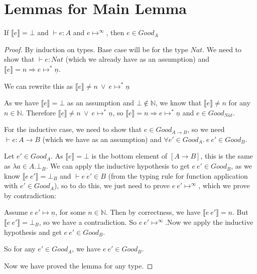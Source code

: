 \section{Lemmas for Main Lemma}

\begin{lem}\label{infinite}
If $\llbracket e \rrbracket = \bot$ and $\vdash e : A$ and $e \mapsto^{\infty}$, then $e \in Good_A$
\end{lem}

\begin{proof}
By induction on types. Base case will be for the type $Nat$. We need to show that $\vdash e : Nat$ (which we already have as an assumption) and $\llbracket e \rrbracket = n \Rightarrow e \mapsto^* \underline{n}$. 

We can rewrite this as $\llbracket e \rrbracket \neq n \ \vee \ e \mapsto^* \underline{n}$

As we have $\llbracket e \rrbracket = \bot$ as an assumption and $\bot \notin \mathbb{N}$, we know that $\llbracket e \rrbracket \neq n$ for any $n \in \mathbb{N}$. Therefore $\llbracket e \rrbracket \neq n \ \vee \ e \mapsto^* \underline{n}$, so $\llbracket e \rrbracket = n \Rightarrow e \mapsto^* \underline{n}$ and $e \in Good_{Nat}$.  

For the inductive case, we need to show that $e \in Good_{A \to B}$, so we need $\vdash e : A \to B$ (which we have as an assumption) and $\forall e' \in Good_A. \ e \ e' \in Good_B$.

Let $e' \in Good_A$. As $\llbracket e \rrbracket = \bot$ is the bottom element of $[ A \to B]$, this is the same as $\lambda a \in A. \bot_B$.  We can apply the inductive hypothesis to get $e \ e' \in Good_B$, as we know $\llbracket e \ e' \rrbracket = \bot_B$ and $\vdash e \ e' \in B$ (from the typing rule for function application with $e' \in Good_A$), so to do this, we just need to prove $e \ e' \mapsto^{\infty}$, which we prove by contradiction:

Assume $e \ e' \mapsto \underline{n}$, for some $n \in \mathbb{N}$. Then by correctness, we have $\llbracket e \ e' \rrbracket = n$. But $\llbracket
e \ e' \rrbracket = \bot_B$, so we have a contradiction. So $e \ e' \mapsto^{\infty}$.Now we apply the inductive hypothesis and get $e \ e' \in Good_B$. 

So for any $e' \in Good_A$, we have $e \ e' \in Good_B$.

Now we have proved the lemma for any type.
\end{proof}

